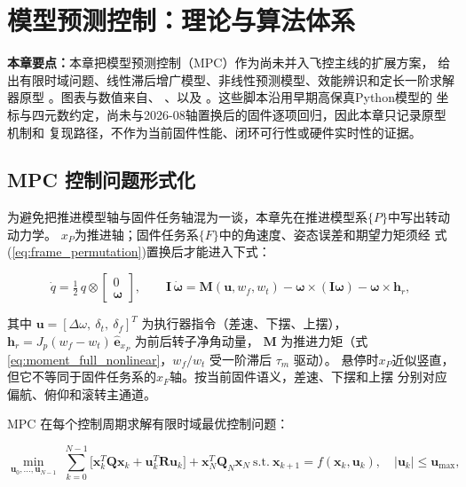 \section{模型预测控制：理论与算法体系}
\label{sec:mpc}

\noindent\textbf{本章要点：}本章把模型预测控制（MPC）作为尚未并入飞控主线的扩展方案，
给出有限时域问题、线性滞后增广模型、非线性预测模型、效能辨识和定长一阶求解器原型
\cite{rawlings2020model}。图表与数值来自、
、以及
。这些脚本沿用早期高保真Python模型的
坐标与四元数约定，尚未与2026-08轴置换后的固件逐项回归，因此本章只记录原型机制和
复现路径，不作为当前固件性能、闭环可行性或硬件实时性的证据。

\subsection{MPC 控制问题形式化}
\label{sec:mpc_problem}

为避免把推进模型轴与固件任务轴混为一谈，本章先在推进模型系$\{P\}$中写出转动动力学。
$x_P$为推进轴；固件任务系$\{F\}$中的角速度、姿态误差和期望力矩须经
式(\ref{eq:frame_permutation})置换后才能进入下式：

\begin{equation}
    \dot{q} = \tfrac{1}{2}\, q \otimes \begin{bmatrix} 0 \\ \boldsymbol{\omega} \end{bmatrix},
    \qquad
    \mathbf{I}\,\dot{\boldsymbol{\omega}}
        = \boldsymbol{M}(\mathbf{u}, w_f, w_t) - \boldsymbol{\omega}\times(\mathbf{I}\boldsymbol{\omega}) - \boldsymbol{\omega}\times\mathbf{h}_r,
    \label{eq:mpc_dynamics}
\end{equation}

其中 $\mathbf{u} = [\Delta\omega,\ \delta_t,\ \delta_f]^T$ 为执行器指令（差速、下摆、上摆），
$\mathbf{h}_r = J_p(w_f - w_t)\,\hat{\mathbf e}_{x_P}$ 为前后转子净角动量，
$\boldsymbol{M}$ 为推进力矩（式\eqref{eq:moment_full_nonlinear}，$w_f/w_t$ 受一阶滞后 $\tau_m$ 驱动）。
悬停时$x_P$近似竖直，但它不等同于固件任务系的$x_F$轴。按当前固件语义，差速、下摆和上摆
分别对应偏航、俯仰和滚转主通道。

MPC 在每个控制周期求解有限时域最优控制问题：

\begin{equation}
    \min_{\mathbf{u}_0,\dots,\mathbf{u}_{N-1}}\;
    \sum_{k=0}^{N-1}\Big[\mathbf{x}_k^T\mathbf{Q}\mathbf{x}_k + \mathbf{u}_k^T\mathbf{R}\mathbf{u}_k\Big]
    + \mathbf{x}_N^T\mathbf{Q}_N\mathbf{x}_N
    \ \text{s.t.}\
    \mathbf{x}_{k+1}=f(\mathbf{x}_k,\mathbf{u}_k),\quad
    |\mathbf{u}_k|\le\mathbf{u}_{\max},
    \label{eq:mpc_ocp}
\end{equation}

